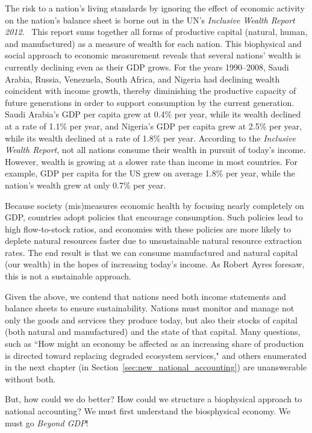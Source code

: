 The risk to a nation's living standards by
ignoring the effect of economic activity 
on the nation's balance sheet is borne out in the UN's \emph{Inclusive Wealth Report 2012}.~\cite{IWR2012}
This report sums together all forms of productive capital 
(natural, human, and manufactured)  as a measure of  wealth 
for each nation.  
This biophysical and social approach to economic measurement
reveals that several 
 nations' wealth is currently declining even as their GDP grows. 
For the years 1990--2008, Saudi Arabia, Russia, Venezuela, South Africa, and Nigeria 
had declining wealth coincident with income growth,
thereby diminishing the productive capacity of future generations
in order to support consumption by the current generation.
Saudi Arabia's GDP per capita grew at 0.4\% per year, 
while its wealth declined at a rate of 1.1\% per year, 
and Nigeria's GDP per capita grew at 2.5\% per year, 
while its wealth declined at a rate of 1.8\% per year.
According to the \emph{Inclusive Wealth Report}, 
not all nations consume their wealth in pursuit of today's income. 
However, wealth is growing at a slower rate than income
in most countries.
For example, GDP per capita for the US grew on average 1.8\% per year, 
while the nation's wealth grew at only 0.7\% per year.\cite[p.~44]{IWR2012}

Because society (mis)measures economic health by focusing 
nearly completely on GDP, 
countries adopt policies that encourage consumption.
Such policies lead to high flow-to-stock ratios,
and economies with these policies are more likely to deplete natural resources faster
due to unsustainable natural resource extraction rates.
The end result is that we can consume manufactured and natural capital (our wealth) 
in the hopes of increasing today's income. 
As Robert Ayres foresaw, this is not 
a sustainable approach.

Given the above, we contend that nations need both 
income statements and
balance sheets
to ensure sustainability. 
Nations must monitor and manage not only the goods and services they produce today, 
but also their stocks of capital (both natural and manufactured)
and the state of that capital. 
Many questions, such as 
``How might an economy be affected as an increasing share of production
is directed toward replacing 
degraded ecosystem services," 
and others enumerated in the next chapter (in Section~\ref{sec:new_national_accounting})
are unanswerable without both.

But, how could we do better? 
How could we structure a biophysical approach to national accounting?
We must first understand the biosphysical economy.
We must go \emph{Beyond GDP}!


